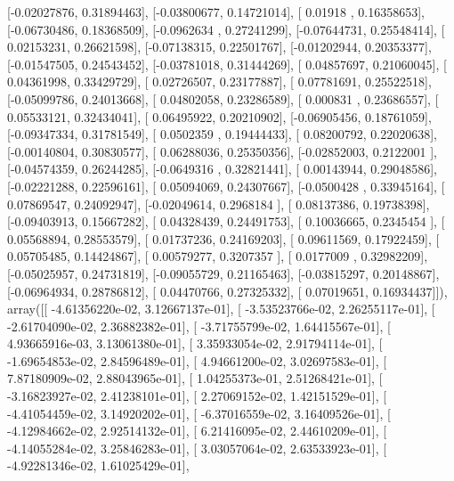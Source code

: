 \documentclass{article}
\begin{document}
       [-0.02027876,  0.31894463],
       [-0.03800677,  0.14721014],
       [ 0.01918   ,  0.16358653],
       [-0.06730486,  0.18368509],
       [-0.0962634 ,  0.27241299],
       [-0.07644731,  0.25548414],
       [ 0.02153231,  0.26621598],
       [-0.07138315,  0.22501767],
       [-0.01202944,  0.20353377],
       [-0.01547505,  0.24543452],
       [-0.03781018,  0.31444269],
       [ 0.04857697,  0.21060045],
       [ 0.04361998,  0.33429729],
       [ 0.02726507,  0.23177887],
       [ 0.07781691,  0.25522518],
       [-0.05099786,  0.24013668],
       [ 0.04802058,  0.23286589],
       [ 0.000831  ,  0.23686557],
       [ 0.05533121,  0.32434041],
       [ 0.06495922,  0.20210902],
       [-0.06905456,  0.18761059],
       [-0.09347334,  0.31781549],
       [ 0.0502359 ,  0.19444433],
       [ 0.08200792,  0.22020638],
       [-0.00140804,  0.30830577],
       [ 0.06288036,  0.25350356],
       [-0.02852003,  0.2122001 ],
       [-0.04574359,  0.26244285],
       [-0.0649316 ,  0.32821441],
       [ 0.00143944,  0.29048586],
       [-0.02221288,  0.22596161],
       [ 0.05094069,  0.24307667],
       [-0.0500428 ,  0.33945164],
       [ 0.07869547,  0.24092947],
       [-0.02049614,  0.2968184 ],
       [ 0.08137386,  0.19738398],
       [-0.09403913,  0.15667282],
       [ 0.04328439,  0.24491753],
       [ 0.10036665,  0.2345454 ],
       [ 0.05568894,  0.28553579],
       [ 0.01737236,  0.24169203],
       [ 0.09611569,  0.17922459],
       [ 0.05705485,  0.14424867],
       [ 0.00579277,  0.3207357 ],
       [ 0.0177009 ,  0.32982209],
       [-0.05025957,  0.24731819],
       [-0.09055729,  0.21165463],
       [-0.03815297,  0.20148867],
       [-0.06964934,  0.28786812],
       [ 0.04470766,  0.27325332],
       [ 0.07019651,  0.16934437]]), array([[ -4.61356220e-02,   3.12667137e-01],
       [ -3.53523766e-02,   2.26255117e-01],
       [ -2.61704090e-02,   2.36882382e-01],
       [ -3.71755799e-02,   1.64415567e-01],
       [  4.93665916e-03,   3.13061380e-01],
       [  3.35933054e-02,   2.91794114e-01],
       [ -1.69654853e-02,   2.84596489e-01],
       [  4.94661200e-02,   3.02697583e-01],
       [  7.87180909e-02,   2.88043965e-01],
       [  1.04255373e-01,   2.51268421e-01],
       [ -3.16823927e-02,   2.41238101e-01],
       [  2.27069152e-02,   1.42151529e-01],
       [ -4.41054459e-02,   3.14920202e-01],
       [ -6.37016559e-02,   3.16409526e-01],
       [ -4.12984662e-02,   2.92514132e-01],
       [  6.21416095e-02,   2.44610209e-01],
       [ -4.14055284e-02,   3.25846283e-01],
       [  3.03057064e-02,   2.63533923e-01],
       [ -4.92281346e-02,   1.61025429e-01],
\end{document}
